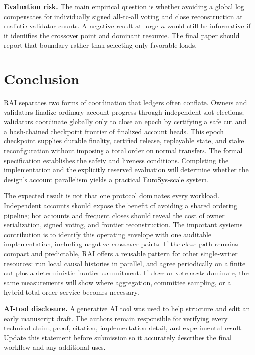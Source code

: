 \documentclass[sigplan,review,anonymous]{acmart}
\newcommand{\sys}{\textsc{RAI}\xspace}
\newcommand{\paragraphhead}[1]{\smallskip\noindent\textbf{#1}}
\begin{document}
\paragraphhead{Evaluation risk.}
The main empirical question is whether avoiding a global log compensates for individually signed all-to-all voting and close reconstruction at realistic validator counts.  A negative result at large $n$ would still be informative if it identifies the crossover point and dominant resource.  The final paper should report that boundary rather than selecting only favorable loads.

\section{Conclusion}

\sys separates two forms of coordination that ledgers often conflate.  Owners and validators finalize ordinary account progress through independent slot elections; validators coordinate globally only to close an epoch by certifying a safe cut and a hash-chained checkpoint frontier of finalized account heads.  This epoch checkpoint supplies durable finality, certified release, replayable state, and stake reconfiguration without imposing a total order on normal transfers.  The formal specification establishes the safety and liveness conditions.  Completing the implementation and the explicitly reserved evaluation will determine whether the design's account parallelism yields a practical EuroSys-scale system.

The expected result is not that one protocol dominates every workload.  Independent accounts should expose the benefit of avoiding a shared ordering pipeline; hot accounts and frequent closes should reveal the cost of owner serialization, signed voting, and frontier reconstruction.  The important systems contribution is to identify this operating envelope with one auditable implementation, including negative crossover points.  If the close path remains compact and predictable, RAI offers a reusable pattern for other single-writer resources: run local causal histories in parallel, and agree periodically on a finite cut plus a deterministic frontier commitment.  If close or vote costs dominate, the same measurements will show where aggregation, committee sampling, or a hybrid total-order service becomes necessary.

\paragraphhead{AI-tool disclosure.}
A generative AI tool was used to help structure and edit an early manuscript draft. The authors remain responsible for verifying every technical claim, proof, citation, implementation detail, and experimental result. Update this statement before submission so it accurately describes the final workflow and any additional uses.

\clearpage
\balance


\end{document}
